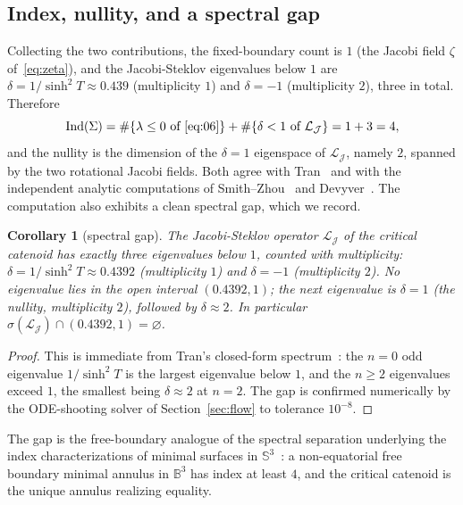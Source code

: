 \documentclass[11pt]{article}
\theoremstyle{definition}
\theoremstyle{plain}
\newtheorem{corollary}[theorem]{Corollary}
\begin{document}
\subsection{Index, nullity, and a spectral gap}

Collecting the two contributions, the fixed-boundary count is $1$ (the Jacobi field $\zeta$ of~\eqref{eq:zeta}), and the Jacobi-Steklov eigenvalues below $1$ are $\delta = 1/\sinh^2 T \approx 0.439$ (multiplicity $1$) and $\delta = -1$ (multiplicity $2$), three in total. Therefore
\begin{equation}
	\mathrm{Ind}(\Sigma) = \#\{\lambda \leq 0 \text{ of }\eqref{eq:06}\} + \#\{\delta < 1 \text{ of } \mathcal{L}_\mathcal{J}\} = 1 + 3 = 4,
\end{equation}
and the nullity is the dimension of the $\delta=1$ eigenspace of $\mathcal{L}_\mathcal{J}$, namely $2$, spanned by the two rotational Jacobi fields. Both agree with Tran~\cite[Theorem 1.3]{tran01} and with the independent analytic computations of Smith--Zhou~\cite{smithzhou01} and Devyver~\cite{devyver01}. The computation also exhibits a clean spectral gap, which we record.

\begin{corollary}[spectral gap]\label{cor:gap}
	The Jacobi-Steklov operator $\mathcal{L}_\mathcal{J}$ of the critical catenoid has exactly three eigenvalues below $1$, counted with multiplicity: $\delta = 1/\sinh^2 T \approx 0.4392$ (multiplicity $1$) and $\delta = -1$ (multiplicity $2$). No eigenvalue lies in the open interval $(0.4392, 1)$; the next eigenvalue is $\delta = 1$ (the nullity, multiplicity $2$), followed by $\delta \approx 2$. In particular $\sigma(\mathcal{L}_\mathcal{J}) \cap (0.4392, 1) = \varnothing$.
\end{corollary}

\begin{proof}
	This is immediate from Tran's closed-form spectrum~\cite[Theorem 4.2]{tran01}: the $n=0$ odd eigenvalue $1/\sinh^2 T$ is the largest eigenvalue below $1$, and the $n\geq 2$ eigenvalues exceed $1$, the smallest being $\delta \approx 2$ at $n=2$. The gap is confirmed numerically by the ODE-shooting solver of Section~\ref{sec:flow} to tolerance $10^{-8}$.
\end{proof}

The gap is the free-boundary analogue of the spectral separation underlying the index characterizations of minimal surfaces in $\mathbb{S}^3$~\cite{urbano01, marquesneves01}: a non-equatorial free boundary minimal annulus in $\mathbb{B}^3$ has index at least $4$, and the critical catenoid is the unique annulus realizing equality.
\end{document}
